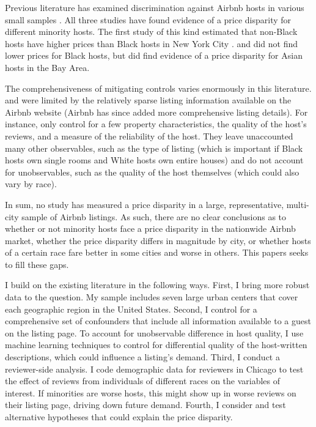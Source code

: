 Previous literature has examined discrimination against Airbnb hosts in various small samples \citep{edelman, wang, kakar}. All three studies have found evidence of a price disparity for different minority hosts. The first study of this kind estimated that non-Black hosts have higher prices than Black hosts in New York City \citep{edelman}. \cite{wang} and \cite{kakar} did not find lower prices for Black hosts, but did find evidence of a price disparity for Asian hosts in the Bay Area. 

The comprehensiveness of mitigating controls varies enormously in this literature. \cite{wang} and \cite{edelman} were limited by the relatively sparse listing information available on the Airbnb website (Airbnb has since added more comprehensive listing details). For instance, \cite{edelman} only control for a few property characteristics, the quality of the host's reviews, and a measure of the reliability of the host. They leave unaccounted many other observables, such as the type of listing (which is important if Black hosts own single rooms and White hosts own entire houses) and do not account for unobservables, such as the quality of the host themselves (which could also vary by race).

In sum, no study has measured a price disparity in a large, representative, multi-city sample of Airbnb listings. As such, there are no clear conclusions as to whether or not minority hosts face a price disparity in the nationwide Airbnb market, whether the price disparity differs in magnitude by city, or whether hosts of a certain race fare better in some cities and worse in others. This papers seeks to fill these gaps. 

I build on the existing literature in the following ways. First, I bring more robust data to the question. My sample includes seven large urban centers that cover each geographic region in the United States. Second, I control for a comprehensive set of confounders that include all information available to a guest on the listing page. To account for unobservable difference in host quality, I use machine learning techniques to control for differential quality of the host-written descriptions, which could influence a listing's demand. Third, I conduct a reviewer-side analysis. I code demographic data for reviewers in Chicago to test the effect of reviews from individuals of different races on the variables of interest. If minorities are worse hosts, this might show up in worse reviews on their listing page, driving down future demand. Fourth, I consider and test alternative hypotheses that could explain the price disparity.

